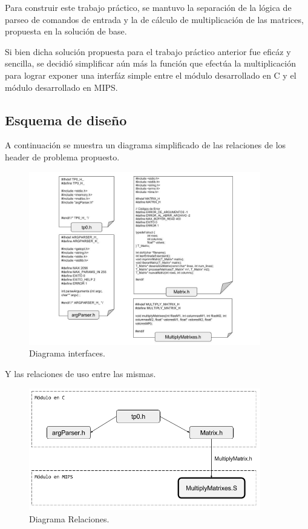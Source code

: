\documentclass[a4paper,10pt]{article}
\begin{document}
Para construir este trabajo pr\'actico, se mantuvo la separaci\'on de la l\'ogica de parseo de comandos de entrada y la de c\'alculo de multiplicaci\'on de las matrices, propuesta en la soluci\'on de base.\par

Si bien dicha soluci\'on propuesta para el trabajo pr\'actico anterior fue efic\'az y sencilla, se decidi\'o simplificar a\'un m\'as la funci\'on que efect\'ua la multiplicaci\'on para lograr exponer una interf\'az simple entre el m\'odulo desarrollado en C y el m\'odulo desarrollado en MIPS.\par




\subsection{Esquema de diseño}
A continuación se muestra un diagrama simplificado de las relaciones de los header de problema propuesto.

\begin{figure}[htbp]
	    \centering
		\includegraphics[width=0.90\textwidth]{content/diagrama_h.jpg}
	    \caption{\scriptsize{Diagrama interfaces.}}
	    \label{fig002}
      \end{figure}

\newpage

Y las relaciones de uso entre las mismas.

\begin{figure}[htbp]
	    \centering
		\includegraphics[width=0.90\textwidth]{content/DiagramaRelaciones.png}
	    \caption{\scriptsize{Diagrama Relaciones.}}
	    \label{fig002}
      \end{figure}
\end{document}
